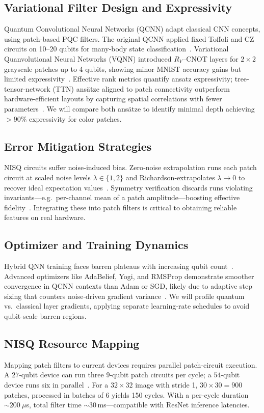 \documentclass[onecolumn,12pt]{IEEEtran}
\begin{document}
\subsection{Variational Filter Design and Expressivity}
Quantum Convolutional Neural Networks (QCNN) adapt classical CNN concepts, using patch‐based PQC filters. The original QCNN applied fixed Toffoli and CZ circuits on 10–20 qubits for many‐body state classification~\cite{cong2019qcnn}. Variational Quanvolutional Neural Networks (VQNN) introduced $R_Y$–CNOT layers for $2\times2$ grayscale patches up to 4 qubits, showing minor MNIST accuracy gains but limited expressivity~\cite{henderson2019quanvolutional,mattern2021variational}. Effective rank metrics quantify ansatz expressivity; tree‐tensor‐network (TTN) ansätze aligned to patch connectivity outperform hardware‐efficient layouts by capturing spatial correlations with fewer parameters~\cite{yao2025learning,sugisaki2019quantum}. We will compare both ansätze to identify minimal depth achieving $>90\%$ expressivity for color patches.

\subsection{Error Mitigation Strategies}
NISQ circuits suffer noise‐induced bias. Zero‐noise extrapolation runs each patch circuit at scaled noise levels $\lambda\in\{1,2\}$ and Richardson‐extrapolates $\lambda\to0$ to recover ideal expectation values~\cite{zhu2022efficient}. Symmetry verification discards runs violating invariants—e.g.\ per‐channel mean of a patch amplitude—boosting effective fidelity~\cite{mcclean2018barren}. Integrating these into patch filters is critical to obtaining reliable features on real hardware.

\subsection{Optimizer and Training Dynamics}
Hybrid QNN training faces barren plateaus with increasing qubit count~\cite{mcclean2018barren}. Advanced optimizers like AdaBelief, Yogi, and RMSProp demonstrate smoother convergence in QCNN contexts than Adam or SGD, likely due to adaptive step sizing that counters noise‐driven gradient variance~\cite{zhuang2020adabelief,ceschini2025quanvnn}. We will profile quantum vs.\ classical layer gradients, applying separate learning‐rate schedules to avoid qubit‐scale barren regions.

\subsection{NISQ Resource Mapping}
Mapping patch filters to current devices requires parallel patch‐circuit execution. A $27$‐qubit device can run three $9$‐qubit patch circuits per cycle; a $54$‐qubit device runs six in parallel~\cite{henderson2019quanvolutional,cong2019qcnn}. For a $32\times32$ image with stride 1, $30\times30=900$ patches, processed in batches of 6 yields 150 cycles. With a per‐cycle duration $\sim200\ \mu$s, total filter time $\sim30\,$ms—compatible with ResNet inference latencies.
\end{document}

